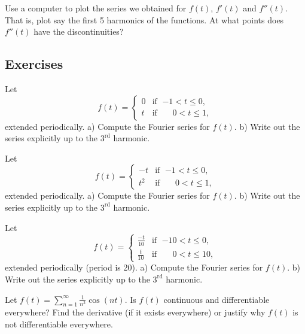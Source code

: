 \documentclass[12pt]{book}
\begin{document}
\begin{exercise}
Use a computer to plot the series we obtained for $f(t)$, $f'(t)$ and
$f''(t)$.  That is, plot say the first 5 harmonics of the functions.  At what
points does $f''(t)$ have the discontinuities?
\end{exercise}

\subsection{Exercises}

\begin{exercise}
Let
\begin{equation*}
f(t) =
\begin{cases}
0 & \text{if } \; {-1} < t \leq 0 , \\
t & \text{if } \; \phantom{-}0 < t \leq  1 ,
\end{cases}
\end{equation*}
extended periodically.
a) Compute the Fourier series for $f(t)$.  b) Write out the series explicitly up
to the $3^{\text{rd}}$ harmonic.
\end{exercise}

\begin{exercise}
Let
\begin{equation*}
f(t) =
\begin{cases}
-t & \text{if } \; {-1} < t \leq 0 , \\
t^2 & \text{if } \; \phantom{-}0 < t \leq  1 ,
\end{cases}
\end{equation*}
extended periodically.
a) Compute the Fourier series for $f(t)$.  b) Write out the series explicitly up
to the $3^{\text{rd}}$ harmonic.
\end{exercise}

\begin{exercise}
Let
\begin{equation*}
f(t) =
\begin{cases}
\frac{-t}{10} & \text{if } \; {-10} < t \leq 0 , \\
\frac{t}{10} & \text{if } \; \phantom{-1}0 < t \leq  10 ,
\end{cases}
\end{equation*}
extended periodically (period is 20).
a) Compute the Fourier series for $f(t)$.  b) Write out the series explicitly up
to the $3^{\text{rd}}$ harmonic.
\end{exercise}

\begin{exercise}
Let $f(t) = \sum_{n=1}^\infty \frac{1}{n^3} \cos (n t)$.  Is $f(t)$
continuous and differentiable everywhere?  Find the derivative (if it exists
everywhere)
or justify why $f(t)$ is not differentiable everywhere.
\end{exercise}
\end{document}
